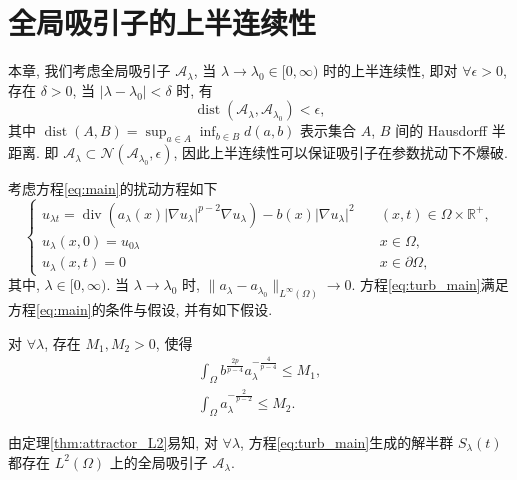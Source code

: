 \documentclass[oneside,longtitle]{LZUthesis}
\numberwithin{equation}{chapter}
\newcommand*\abs[1]{\lvert#1\rvert}
\newcommand*\norm[1]{\lVert#1\rVert}
\newcommand\R{\mathbb{R}}
\DeclareMathOperator{\Div}{div}
\DeclareMathOperator{\dist}{dist}
\begin{document}
\chapter{全局吸引子的上半连续性}
本章, 我们考虑全局吸引子 $\mathcal{A}_\lambda$, 当 $\lambda \to \lambda_0 \in [0, \infty)$ 时的上半连续性, 即对
$\forall \epsilon > 0$, 存在 $\delta > 0$, 当 $\abs{\lambda - \lambda_0} < \delta$ 时, 有
\begin{equation*}
	\dist(\mathcal{A}_\lambda, \mathcal{A}_{\lambda_0}) < \epsilon,
\end{equation*}
其中 $\dist(A, B) = \sup_{a \in A}\inf_{b \in B}d(a, b)$ 表示集合 $A$, $B$ 间的 Hausdorff 半距离.
即 $\mathcal{A}_\lambda \subset \mathcal{N}(\mathcal{A}_{\lambda_0}, \epsilon)$, 因此上半连续性可以保证吸引子在参数扰动下不爆破.

考虑方程\cref{eq:main}的扰动方程如下
\begin{equation}\label{eq:turb_main}
	\begin{cases}
		u_{\lambda t} = \Div(a_{\lambda}(x)\abs{\nabla u_{\lambda}}^{p-2}\nabla u_{\lambda}) - b(x)\abs{\nabla u_{\lambda}}^2
		\quad &(x, t) \in \Omega \times \R^+,\\
		u_{\lambda}(x,0) = u_{0\lambda} \quad &x \in \Omega,\\
		u_{\lambda}(x, t) = 0 \quad &x \in \partial\Omega,
	\end{cases}
\end{equation}
其中, $\lambda \in [0, \infty)$. 当 $\lambda \to \lambda_0$ 时, $\norm{a_\lambda - a_{\lambda_0}}_{L^\infty(\Omega)} \to 0$.
方程\eqref{eq:turb_main}满足方程\eqref{eq:main}的条件与假设, 并有如下假设.

对 $\forall \lambda$, 存在 $M_1, M_2 > 0$, 使得
\begin{gather}
	\int_{\Omega} b^{\frac{2p}{p-4}}a_\lambda^{-\frac{4}{p-4}} \leq M_1, \label{h1} \\
	\int_{\Omega}a_\lambda^{-\frac{2}{p-2}} \leq M_2. \label{h2}
\end{gather}

由定理\ref{thm:attractor_L2}易知, 对 $\forall \lambda$,
方程\eqref{eq:turb_main}生成的解半群 $S_{\lambda}(t)$ 都存在 $L^2(\Omega)$ 上的全局吸引子 $\mathcal{A}_\lambda$.
\end{document}
